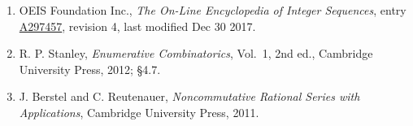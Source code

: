 \documentclass[11pt]{article}
\theoremstyle{definition}
\begin{document}
\begin{enumerate}

\item OEIS Foundation Inc., \emph{The On-Line Encyclopedia of Integer Sequences}, entry \href{https://oeis.org/A297457}{A297457}, revision 4, last modified Dec 30 2017.

\item R. P. Stanley, \emph{Enumerative Combinatorics}, Vol.~1, 2nd ed., Cambridge University Press, 2012; \S4.7.

\item J. Berstel and C. Reutenauer, \emph{Noncommutative Rational Series with Applications}, Cambridge University Press, 2011.

\end{enumerate}
\end{document}
